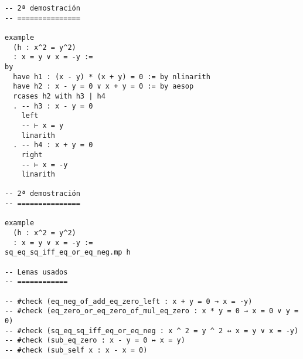 \begin{verbatim}
-- 2ª demostración
-- ===============

example
  (h : x^2 = y^2)
  : x = y ∨ x = -y :=
by
  have h1 : (x - y) * (x + y) = 0 := by nlinarith
  have h2 : x - y = 0 ∨ x + y = 0 := by aesop
  rcases h2 with h3 | h4
  . -- h3 : x - y = 0
    left
    -- ⊢ x = y
    linarith
  . -- h4 : x + y = 0
    right
    -- ⊢ x = -y
    linarith

-- 2ª demostración
-- ===============

example
  (h : x^2 = y^2)
  : x = y ∨ x = -y :=
sq_eq_sq_iff_eq_or_eq_neg.mp h

-- Lemas usados
-- ============

-- #check (eq_neg_of_add_eq_zero_left : x + y = 0 → x = -y)
-- #check (eq_zero_or_eq_zero_of_mul_eq_zero : x * y = 0 → x = 0 ∨ y = 0)
-- #check (sq_eq_sq_iff_eq_or_eq_neg : x ^ 2 = y ^ 2 ↔ x = y ∨ x = -y)
-- #check (sub_eq_zero : x - y = 0 ↔ x = y)
-- #check (sub_self x : x - x = 0)
\end{verbatim}

